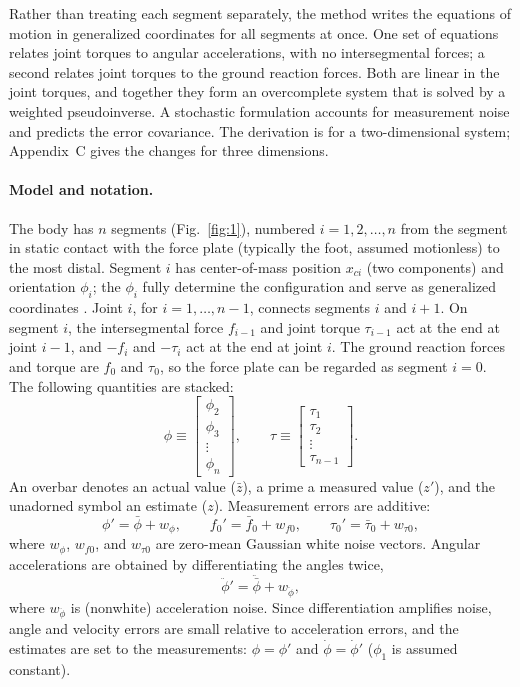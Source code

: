 \documentclass[11pt]{article}
\begin{document}
Rather than treating each segment separately, the method writes the equations
of motion in generalized coordinates for all segments at once. One set of
equations relates joint torques to angular accelerations, with no
intersegmental forces; a second relates joint torques to the ground reaction
forces. Both are linear in the joint torques, and together they form an
overcomplete system that is solved by a weighted pseudoinverse. A stochastic
formulation accounts for measurement noise and predicts the error covariance.
The derivation is for a two-dimensional system; Appendix~C gives the changes
for three dimensions.

\paragraph{Model and notation.} The body has $n$ segments (Fig.~\ref{fig:1}),
numbered $i=1,2,\ldots,n$ from the segment in static contact with the force
plate (typically the foot, assumed motionless) to the most distal. Segment $i$
has center-of-mass position $x_{ci}$ (two components) and orientation
$\phi_i$; the $\phi_i$ fully determine the configuration and serve as
generalized coordinates \cite{Greenwood1988}. Joint $i$, for
$i=1,\ldots,n-1$, connects segments $i$ and $i+1$. On segment $i$, the
intersegmental force $f_{i-1}$ and joint torque $\tau_{i-1}$ act at the end
at joint $i-1$, and $-f_i$ and $-\tau_i$ act at the end at joint $i$. The
ground reaction forces and torque are $f_0$ and $\tau_0$, so the force plate
can be regarded as segment $i=0$. The following quantities are stacked:
\[
\phi \equiv \begin{bmatrix}\phi_2\\ \phi_3\\ \vdots\\ \phi_n\end{bmatrix},
\qquad
\tau \equiv \begin{bmatrix}\tau_1\\ \tau_2\\ \vdots\\ \tau_{n-1}\end{bmatrix}.
\]
An overbar denotes an actual value ($\bar{z}$), a prime a measured value
($z'$), and the unadorned symbol an estimate ($z$). Measurement errors are
additive:
\[
\phi' = \bar{\phi} + w_{\phi}, \qquad
f_0' = \bar{f}_0 + w_{f0}, \qquad
\tau_0' = \bar{\tau}_0 + w_{\tau0},
\]
where $w_{\phi}$, $w_{f0}$, and $w_{\tau0}$ are zero-mean Gaussian white noise
vectors. Angular accelerations are obtained by differentiating the angles
twice,
\[
\ddot{\phi}' = \ddot{\bar{\phi}} + w_{\ddot{\phi}},
\]
where $w_{\ddot{\phi}}$ is (nonwhite) acceleration noise. Since
differentiation amplifies noise, angle and velocity errors are small relative
to acceleration errors, and the estimates are set to the measurements:
$\phi=\phi'$ and $\dot{\phi}=\dot{\phi}'$ ($\phi_1$ is assumed constant).
\end{document}

